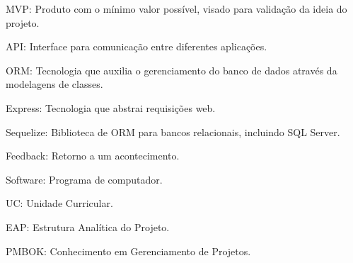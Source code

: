 MVP:		Produto com o mínimo valor possível, visado para validação da ideia do projeto.

API:		Interface para comunicação entre diferentes aplicações.

ORM:		Tecnologia que auxilia o gerenciamento do banco de dados através da modelagens de classes.

Express:	Tecnologia que abstrai requisições web.

Sequelize:	Biblioteca de ORM para bancos relacionais, incluindo SQL Server.

Feedback:	Retorno a um acontecimento.

Software:	Programa de computador.

UC:			Unidade Curricular.

EAP:		Estrutura Analítica do Projeto.

PMBOK:      Conhecimento em Gerenciamento de Projetos.






